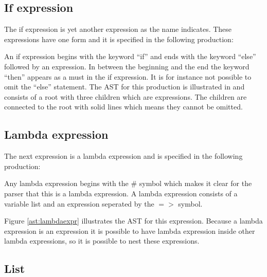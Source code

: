 \subsection{If expression}

The if expression is yet another expression as the name indicates. These expressions have one form and it is specified in the following production:

\begin{ebnf}
\end{ebnf}

An if expression begins with the keyword ``if'' and ends with the keyword ``else'' followed by an expression. In between the beginning and the end the keyword ``then'' appears as a must in the if expression. It is for instance not possible to omit the ``else'' statement. The AST for this production is illustrated in  and consists of a root with three children which are expressions. The children are connected to the root with solid lines which means they cannot be omitted.



\subsection{Lambda expression}

The next expression is a lambda expression and is specified in the following production:

\begin{ebnf}
\end{ebnf}

Any lambda expression begins with the \# symbol which makes it clear for the parser that this is a lambda expression. A lambda expression consists of a variable list and an expression seperated by the $=>$ symbol. 



Figure \ref{ast:lambdaexpr} illustrates the AST for this expression. Because a lambda expression is an expression it is possible to have lambda expression inside other lambda expressions, so it is possible to nest these expressions.

\subsection{List}

